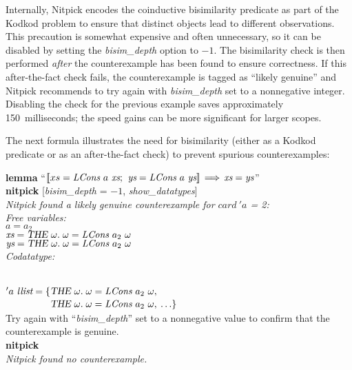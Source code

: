 \documentclass[a4paper,12pt]{article}
\def\unr{\ldots}
\begin{document}
Internally, Nitpick encodes the coinductive bisimilarity predicate as part of
the Kodkod problem to ensure that distinct objects lead to different
observations. This precaution is somewhat expensive and often unnecessary, so it
can be disabled by setting the \textit{bisim\_depth} option to $-1$. The
bisimilarity check is then performed \textsl{after} the counterexample has been
found to ensure correctness. If this after-the-fact check fails, the
counterexample is tagged as ``likely genuine'' and Nitpick recommends to try
again with \textit{bisim\_depth} set to a nonnegative integer. Disabling the
check for the previous example saves approximately 150~milli\-seconds; the speed
gains can be more significant for larger scopes.

The next formula illustrates the need for bisimilarity (either as a Kodkod
predicate or as an after-the-fact check) to prevent spurious counterexamples:

\prew
\textbf{lemma} ``$\mathopen{[\![} xs = \textit{LCons}~a~\textit{xs};\>\, \textit{ys} = \textit{LCons}~a~\textit{ys}\mathclose{]\!]}
\,\Longrightarrow\, \textit{xs} = \textit{ys}$'' \\
\textbf{nitpick} [\textit{bisim\_depth} = $-1$, \textit{show\_datatypes}] \\[2\smallskipamount]
\slshape Nitpick found a likely genuine counterexample for $\textit{card}~'a$ = 2: \\[2\smallskipamount]
\hbox{}\qquad Free variables: \nopagebreak \\
\hbox{}\qquad\qquad $a = a_2$ \\
\hbox{}\qquad\qquad $\textit{xs} = \textsl{THE}~\omega.\; \omega =
\textit{LCons}~a_2~\omega$ \\
\hbox{}\qquad\qquad $\textit{ys} = \textsl{THE}~\omega.\; \omega = \textit{LCons}~a_2~\omega$ \\
\hbox{}\qquad Codatatype:\strut \nopagebreak \\
\hbox{}\qquad\qquad $'a~\textit{llist} =
\{\!\begin{aligned}[t]
  & \textsl{THE}~\omega.\; \omega = \textit{LCons}~a_2~\omega, \\[-2pt]
  & \textsl{THE}~\omega.\; \omega = \textit{LCons}~a_2~\omega,\> \unr\}\end{aligned}$
\\[2\smallskipamount]
Try again with ``\textit{bisim\_depth}'' set to a nonnegative value to confirm
that the counterexample is genuine. \\[2\smallskipamount]
{\upshape\textbf{nitpick}} \\[2\smallskipamount]
\slshape Nitpick found no counterexample.
\postw
\end{document}
